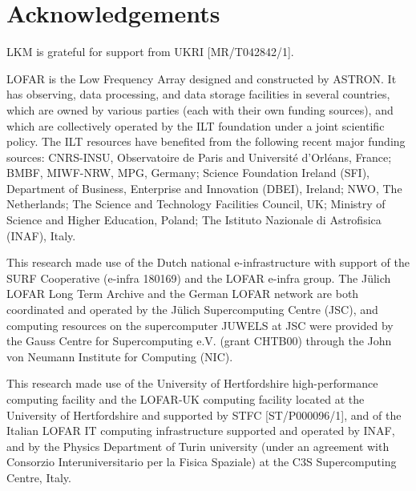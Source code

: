 \documentclass[usenatbib,fleqn,letters]{mnras}
\begin{document}
\section*{Acknowledgements}
LKM is grateful for support from UKRI [MR/T042842/1]. 

LOFAR is the Low Frequency Array designed and constructed by ASTRON. It has observing, data processing, and data storage facilities in several countries, which are owned by various parties (each with their own funding sources), and which are collectively operated by the ILT foundation under a joint scientific policy. The ILT resources have benefited from the following recent major funding sources: CNRS-INSU, Observatoire de Paris and Université d'Orléans, France; BMBF, MIWF-NRW, MPG, Germany; Science Foundation Ireland (SFI), Department of Business, Enterprise and Innovation (DBEI), Ireland; NWO, The Netherlands; The Science and Technology Facilities Council, UK; Ministry of Science and Higher Education, Poland; The Istituto Nazionale di Astrofisica (INAF), Italy.

This research made use of the Dutch national e-infrastructure with support of the SURF Cooperative (e-infra 180169) and the LOFAR e-infra group. The Jülich LOFAR Long Term Archive and the German LOFAR network are both coordinated and operated by the Jülich Supercomputing Centre (JSC), and computing resources on the supercomputer JUWELS at JSC were provided by the Gauss Centre for Supercomputing e.V. (grant CHTB00) through the John von Neumann Institute for Computing (NIC).

This research made use of the University of Hertfordshire high-performance computing facility and the LOFAR-UK computing facility located at the University of Hertfordshire and supported by STFC [ST/P000096/1], and of the Italian LOFAR IT computing infrastructure supported and operated by INAF, and by the Physics Department of Turin university (under an agreement with Consorzio Interuniversitario per la Fisica Spaziale) at the C3S Supercomputing Centre, Italy.
\end{document}
